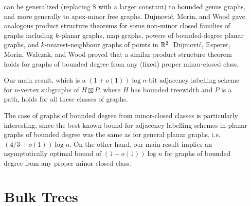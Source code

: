 \documentclass[kpfonts]{patmorin}
\begin{document}
 can be generalized (replacing $8$ with a larger constant) to bounded genus graphs, and more generally to apex-minor free graphs.
Dujmović, Morin, and Wood \cite{dujmovic.morin.ea:structure} gave analogous product structure theorems for some non-minor closed families of graphs including $k$-planar graphs, map graphs, powers of bounded-degree planar graphs, and $k$-nearest-neighbour graphs of points in $\mathbb{R}^2$. Dujmović, Esperet, Morin, Walczak, and Wood \cite{DEMWW20} proved that a similar product structure theorem holds for graphs of bounded degree from any (fixed) proper minor-closed class.


Our main result, which is a $(1+o(1))\log n$-bit adjacency labelling scheme for $n$-vertex subgraphs of $H\boxtimes P$, where $H$ has bounded treewidth and $P$ is a path, holds for all these classes of graphs.

The case of graphs of bounded degree from minor-closed classes is particularly interesting, 
since the best known bound for adjacency labelling schemes in planar graphs of bounded degree was the same as for general planar graphs, i.e.\ $(4/3+o(1))\log n$. On the other hand, our main result implies an asymptotically optimal bound of $(1+o(1))\log n$ for graphs of bounded degree from any proper minor-closed class.


\section{Bulk Trees}
\end{document}
